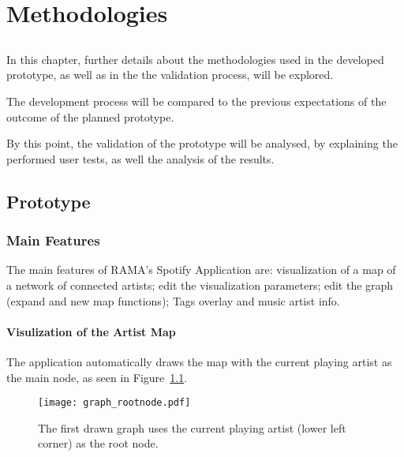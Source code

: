 

\chapter{Methodologies}
\label{chap:chap4}

\section*{}

In this chapter, further details about the methodologies used in the developed prototype, as well as in the the validation process, will be explored.

The development process will be compared to the previous expectations of the outcome of the planned prototype.

By this point, the validation of the prototype will be analysed, by explaining the performed user tests, as well the analysis of the results.


\section{Prototype} %
\label{sec:prototype}

  \subsection{Main Features} %
    \label{sub:main_features}
    
    The main features of RAMA's Spotify Application are: visualization of a map of a network of connected artists; edit the visualization parameters; edit the graph (expand and new map functions); Tags overlay and music artist info.

    \subsubsection{Visulization of the Artist Map} %
      \label{ssub:visualization}
    
      The application automatically draws the map with the current playing artist as the main node, as seen in Figure~\ref{fig:graph_rootnode}.

      \begin{figure}[tb]
        \begin{center}
          \texttt{[image: graph\_rootnode.pdf]}
        \end{center}
        \caption{The first drawn graph uses the current playing artist (lower left corner) as the root node.}
        \label{fig:graph_rootnode}
      \end{figure}

